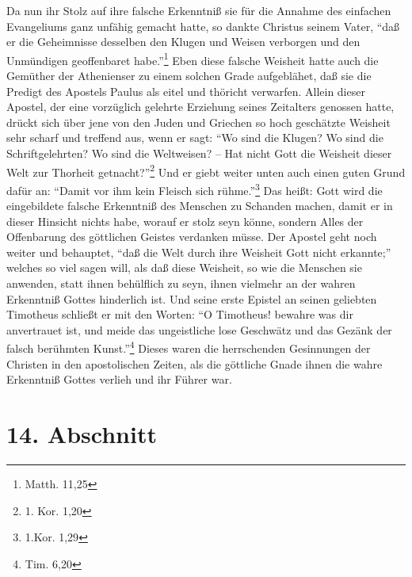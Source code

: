 Da nun ihr Stolz auf ihre falsche Erkenntniß sie für die Annahme des einfachen
Evangeliums ganz unfähig gemacht hatte, so dankte Christus seinem Vater, "`daß
er die Geheimnisse desselben den Klugen und Weisen verborgen und den Unmündigen
geoffenbaret habe."'\footnote{Matth. 11,25} Eben diese falsche Weisheit hatte
auch die Gemüther der Athenienser zu einem solchen Grade aufgeblähet, daß sie
die Predigt des Apostels Paulus als eitel und thöricht verwarfen. Allein dieser
Apostel, der eine vorzüglich gelehrte Erziehung seines Zeitalters genossen
hatte, drückt sich über jene von den Juden und Griechen so hoch geschätzte
Weisheit sehr scharf und treffend aus, wenn er sagt: "`Wo sind die Klugen? Wo
sind die Schriftgelehrten? Wo sind die Weltweisen? -- Hat nicht Gott die
Weisheit dieser Welt zur Thorheit getnacht?"'\footnote{1. Kor. 1,20} Und er
giebt weiter unten auch einen guten Grund dafür an: "`Damit vor ihm kein Fleisch
sich rühme."'\footnote{1.Kor. 1,29} Das heißt: Gott wird die eingebildete
falsche Erkenntniß des Menschen zu Schanden machen, damit er in dieser Hinsicht
nichts habe, worauf er stolz seyn könne, sondern Alles der Offenbarung des
göttlichen Geistes verdanken müsse. Der Apostel geht noch weiter und behauptet,
"`daß die Welt durch ihre Weisheit Gott nicht erkannte;"' welches so viel sagen
will, als daß diese Weisheit, so wie die Menschen sie anwenden, statt ihnen
behülflich zu seyn, ihnen vielmehr an der wahren Erkenntniß Gottes hinderlich
ist. Und seine erste Epistel an seinen geliebten Timotheus schließt er mit den
Worten: "`O Timotheus! bewahre was dir anvertrauet ist, und meide das
ungeistliche lose Geschwätz und das Gezänk der falsch berühmten
Kunst."'\footnote{Tim. 6,20} Dieses waren die herrschenden Gesinnungen der
Christen in den apostolischen Zeiten, als die göttliche Gnade ihnen die wahre
Erkenntniß Gottes verlieh und ihr Führer war.

\section{14. Abschnitt}


